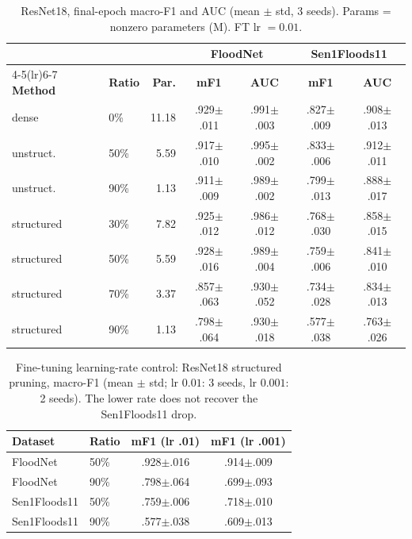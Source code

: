 \documentclass[conference]{IEEEtran}
\begin{document}
\begin{table}[t]
\centering
\caption{ResNet18, final-epoch macro-F1 and AUC (mean $\pm$ std, 3
seeds). Params = nonzero parameters (M). FT lr $=0.01$.}
\label{tab:resnet}
\footnotesize
\setlength{\tabcolsep}{3.4pt}
\begin{tabular}{llr cc cc}
\toprule
& & & \multicolumn{2}{c}{\textbf{FloodNet}} &
\multicolumn{2}{c}{\textbf{Sen1Floods11}}\\
\cmidrule(lr){4-5}\cmidrule(lr){6-7}
\textbf{Method} & \textbf{Ratio} & \textbf{Par.} &
\textbf{mF1} & \textbf{AUC} & \textbf{mF1} & \textbf{AUC}\\
\midrule
dense        & 0\%  & 11.18 & .929$\pm$.011 & .991$\pm$.003 & .827$\pm$.009 & .908$\pm$.013\\
\midrule
unstruct.    & 50\% &  5.59 & .917$\pm$.010 & .995$\pm$.002 & .833$\pm$.006 & .912$\pm$.011\\
unstruct.    & 90\% &  1.13 & .911$\pm$.009 & .989$\pm$.002 & .799$\pm$.013 & .888$\pm$.017\\
\midrule
structured   & 30\% &  7.82 & .925$\pm$.012 & .986$\pm$.012 & .768$\pm$.030 & .858$\pm$.015\\
structured   & 50\% &  5.59 & .928$\pm$.016 & .989$\pm$.004 & .759$\pm$.006 & .841$\pm$.010\\
structured   & 70\% &  3.37 & .857$\pm$.063 & .930$\pm$.052 & .734$\pm$.028 & .834$\pm$.013\\
structured   & 90\% &  1.13 & .798$\pm$.064 & .930$\pm$.018 & .577$\pm$.038 & .763$\pm$.026\\
\bottomrule
\end{tabular}
\end{table}

\begin{table}[t]
\centering
\caption{Fine-tuning learning-rate control: ResNet18 structured
pruning, macro-F1 (mean $\pm$ std; lr $0.01$: 3 seeds, lr $0.001$: 2
seeds). The lower rate does not recover the Sen1Floods11 drop.}
\label{tab:lrcontrol}
\footnotesize
\begin{tabular}{llcc}
\toprule
\textbf{Dataset} & \textbf{Ratio} & \textbf{mF1 (lr .01)} &
\textbf{mF1 (lr .001)}\\
\midrule
FloodNet     & 50\% & .928$\pm$.016 & .914$\pm$.009\\
FloodNet     & 90\% & .798$\pm$.064 & .699$\pm$.093\\
Sen1Floods11 & 50\% & .759$\pm$.006 & .718$\pm$.010\\
Sen1Floods11 & 90\% & .577$\pm$.038 & .609$\pm$.013\\
\bottomrule
\end{tabular}
\end{table}
\end{document}
